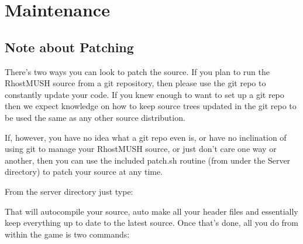 \documentclass[letterpaper,10pt,english]{sphinxmanual}
\begin{document}
\chapter{Maintenance}
\label{\detokenize{maintenance:maintenance}}\label{\detokenize{maintenance::doc}}

\section{Note about Patching}
\label{\detokenize{maintenance:note-about-patching}}
\sphinxAtStartPar
There’s two ways you can look to patch the source.  If you plan to run the
RhostMUSH source from a git repository, then please use the git repo to
constantly update your code.  If you knew enough to want to set up a git repo
then we expect knowledge on how to keep source trees updated in the git repo
to be used the same as any other source distribution.

\sphinxAtStartPar
If, however, you have no idea what a git repo even is, or have no inclination
of using git to manage your RhostMUSH source, or just don’t care one way
or another, then you can use the included patch.sh routine (from under the
Server directory) to patch your source at any time.

\sphinxAtStartPar
From the server directory just type:

\begin{sphinxVerbatim}[commandchars=\\\{\}]
\end{sphinxVerbatim}

\sphinxAtStartPar
That will auto\sphinxhyphen{}compile your source, auto make all your header files and
essentially keep everything up to date to the latest source.
Once that’s done, all you do from within the game is two commands:

\begin{sphinxVerbatim}[commandchars=\\\{\}]
           
           
\end{sphinxVerbatim}
\end{document}
